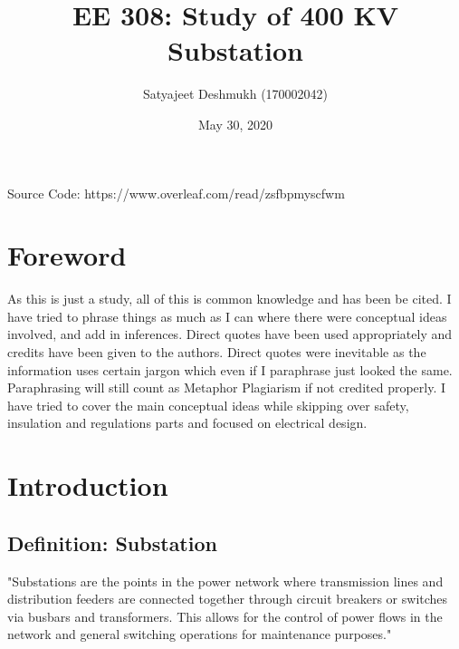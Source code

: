 \documentclass[11pt, a4paper]{article} %
\title{EE 308: Study of 400 KV Substation} %
\author{Satyajeet Deshmukh (170002042)}    %
\date{May 30, 2020\small} %
\begin{document}
%

\maketitle %

\begin{center}
    Source Code: https://www.overleaf.com/read/zsfbpmyscfwm
\end{center}

\setcounter{page}{1} %

\section{Foreword}
As this is just a study, all of this is common knowledge  and has been be cited. I have tried to phrase things as much as I can where there were conceptual ideas involved, and add in inferences. Direct quotes have been used appropriately and credits have been given to the authors. Direct quotes were inevitable as the information uses certain jargon which even if I paraphrase just looked the same. Paraphrasing will still count as Metaphor Plagiarism if not credited properly. I have tried to cover the main conceptual ideas while skipping over safety, insulation and regulations parts and focused on electrical design.

\section{Introduction} %
\subsection{Definition: Substation} %
"Substations are the points in the power network where transmission lines and distribution feeders are connected together through circuit breakers or switches via busbars and transformers. This allows for the control of power flows in the network and general switching operations for maintenance purposes." \citep[Chap.3]{book1}
\end{document}
